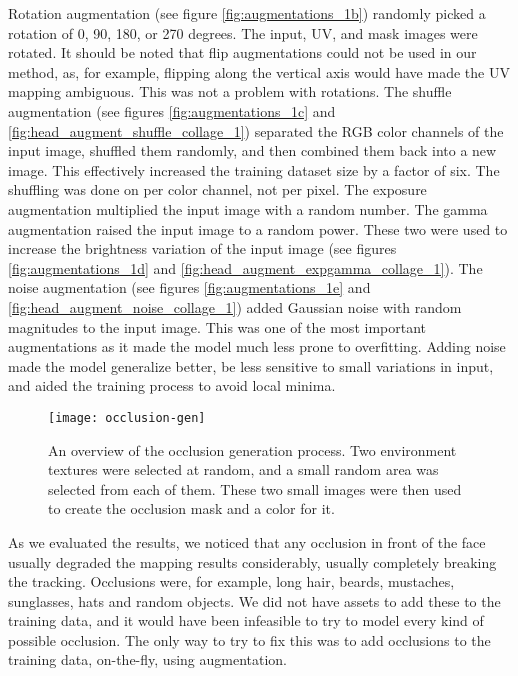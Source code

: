 Rotation augmentation (see figure \ref{fig:augmentations_1b}) randomly picked a rotation of 0, 90, 180, or 270 degrees. The input, UV, and mask images were rotated. It should be noted that flip augmentations could not be used in our method, as, for example, flipping along the vertical axis would have made the UV mapping ambiguous. This was not a problem with rotations. The shuffle augmentation (see figures \ref{fig:augmentations_1c} and \ref{fig:head_augment_shuffle_collage_1}) separated the RGB color channels of the input image, shuffled them randomly, and then combined them back into a new image. This effectively increased the training dataset size by a factor of six. The shuffling was done on per color channel, not per pixel. The exposure augmentation multiplied the input image with a random number. The gamma augmentation raised the input image to a random power. These two were used to increase the brightness variation of the input image (see figures \ref{fig:augmentations_1d} and \ref{fig:head_augment_expgamma_collage_1}). The noise augmentation (see figures \ref{fig:augmentations_1e} and \ref{fig:head_augment_noise_collage_1}) added Gaussian noise with random magnitudes to the input image. This was one of the most important augmentations as it made the model much less prone to overfitting. Adding noise made the model generalize better, be less sensitive to small variations in input, and aided the training process to avoid local minima.

\begin{figure}
    \texttt{[image: occlusion-gen]}
    \caption[Occlusion generation]{An overview of the occlusion generation process. Two environment textures were selected at random, and a small random area was selected from each of them. These two small images were then used to create the occlusion mask and a color for it.}
    \label{fig:occlusion_gen_1}
\end{figure}

As we evaluated the results, we noticed that any occlusion in front of the face usually degraded the mapping results considerably, usually completely breaking the tracking. Occlusions were, for example, long hair, beards, mustaches, sunglasses, hats and random objects. We did not have assets to add these to the training data, and it would have been infeasible to try to model every kind of possible occlusion. The only way to try to fix this was to add occlusions to the training data, on-the-fly, using augmentation.


